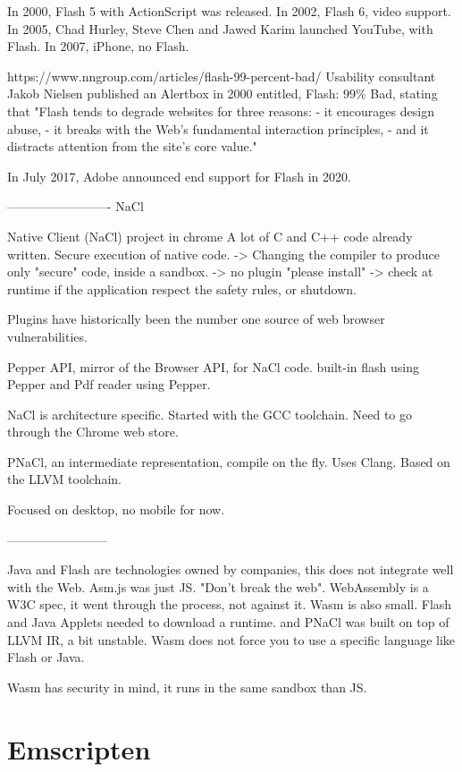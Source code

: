 In 2000, Flash 5 with ActionScript was released.
In 2002, Flash 6, video support.
In 2005, Chad Hurley, Steve Chen and Jawed Karim launched YouTube, with Flash.
In 2007, iPhone, no Flash.

https://www.nngroup.com/articles/flash-99-percent-bad/
Usability consultant Jakob Nielsen published an Alertbox in 2000 entitled,
Flash: 99\% Bad,
stating that "Flash tends to degrade websites for three reasons:
 - it encourages design abuse,
 - it breaks with the Web's fundamental interaction principles,
 - and it distracts attention from the site's core value."

In July 2017, Adobe announced end support for Flash in 2020.

------------------------- NaCl

Native Client (NaCl) project in chrome
A lot of C and C++ code already written.
Secure execution of native code.
-> Changing the compiler to produce only "secure" code, inside a sandbox.
-> no plugin "please install"
-> check at runtime if the application respect the safety rules, or shutdown.

Plugins have historically been the number one source of web browser vulnerabilities.

Pepper API, mirror of the Browser API, for NaCl code.
built-in flash using Pepper and Pdf reader using Pepper.

NaCl is architecture specific. Started with the GCC toolchain.
Need to go through the Chrome web store.

PNaCl, an intermediate representation, compile on the fly. Uses Clang.
Based on the LLVM toolchain.

Focused on desktop, no mobile for now.

------------------------

Java and Flash are technologies owned by companies, this does not integrate well with the Web.
Asm.js was just JS. "Don't break the web".
WebAssembly is a W3C spec, it went through the process, not against it.
Wasm is also small. Flash and Java Applets needed to download a runtime. and PNaCl was built
on top of LLVM IR, a bit unstable.
Wasm does not force you to use a specific language like Flash or Java.

Wasm has security in mind, it runs in the same sandbox than JS.

\section{Emscripten}%
\label{sec:Emscripten}

